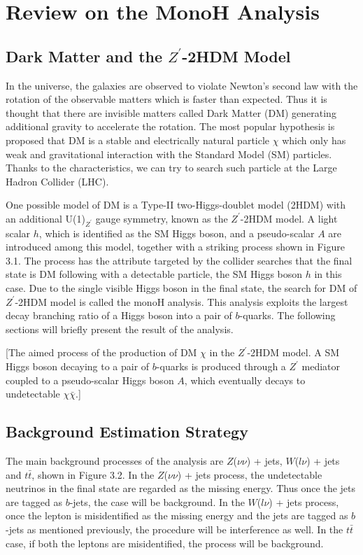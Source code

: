 \documentclass[class=NTHU_thesis, crop=false]{standalone}
\begin{document}
\chapter{Review on the MonoH Analysis}
\section{Dark Matter and the $Z^\prime$-2HDM Model}
In the universe, the galaxies are observed to violate Newton's second law with the rotation of the observable matters which is faster than expected. Thus it is thought that there are invisible matters called Dark Matter (DM) generating additional gravity to accelerate the rotation. The most popular hypothesis is proposed that DM is a stable and electrically natural particle $\chi$ which only has weak and gravitational interaction with the Standard Model (SM) particles. Thanks to the characteristics, we can try to search such particle at the Large Hadron Collider (LHC).

One possible model of DM is a Type-II two-Higgs-doublet model (2HDM) with an additional U(1)$_{Z^\prime}$ gauge symmetry, known as the $Z^\prime$-2HDM model. A light scalar $h$, which is identified as the SM Higgs boson, and a pseudo-scalar $A$ are introduced among this model, together with a striking process shown in Figure 3.1. The process has the attribute targeted by the collider searches that the final state is DM following with a detectable particle, the SM Higgs boson $h$ in this case. Due to the single visible Higgs boson in the final state, the search for DM of $Z^\prime$-2HDM model is called the monoH analysis. This analysis exploits the largest decay branching ratio of a Higgs boson into a pair of $b$-quarks. The following sections will briefly present the result of the analysis.

[The aimed process of the production of DM $\chi$ in the $Z^\prime$-2HDM model. A SM Higgs boson decaying to a pair of $b$-quarks is produced through a $Z^\prime$ mediator coupled to a pseudo-scalar Higgs boson $A$, which eventually decays to undetectable $\chi\bar{\chi}$.]

\section{Background Estimation Strategy}
The main background processes of the analysis are $Z$($\nu\nu$) + jets, $W$($l\nu$) + jets and $t\bar{t}$, shown in Figure 3.2. In the $Z$($\nu\nu$) + jets process, the undetectable neutrinos in the final state are regarded as the missing energy. Thus once the jets are tagged as $b$-jets, the case will be background. In the $W$($l\nu$) + jets process, once the lepton is misidentified as the missing energy and the jets are tagged as $b$-jets as mentioned previously, the procedure will be interference as well. In the $t\bar{t}$ case, if both the leptons are misidentified, the process will be background.
\end{document}
